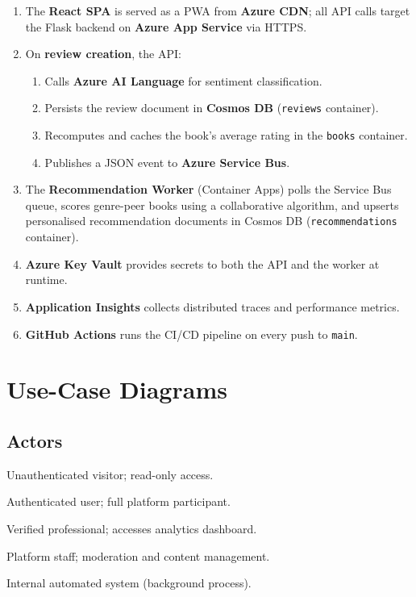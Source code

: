 \documentclass[12pt, a4paper]{report}
\begin{document}
\begin{enumerate}[nosep]
  \item The \textbf{React SPA} is served as a PWA from \textbf{Azure CDN}; all API calls
    target the Flask backend on \textbf{Azure App Service} via HTTPS.
  \item On \textbf{review creation}, the API:
    \begin{enumerate}[nosep, label=\alph*.]
      \item Calls \textbf{Azure AI Language} for sentiment classification.
      \item Persists the review document in \textbf{Cosmos DB} (\texttt{reviews} container).
      \item Recomputes and caches the book's average rating in the \texttt{books} container.
      \item Publishes a JSON event to \textbf{Azure Service Bus}.
    \end{enumerate}
  \item The \textbf{Recommendation Worker} (Container Apps) polls the Service Bus queue,
    scores genre-peer books using a collaborative algorithm, and upserts personalised
    recommendation documents in Cosmos DB (\texttt{recommendations} container).
  \item \textbf{Azure Key Vault} provides secrets to both the API and the worker at runtime.
  \item \textbf{Application Insights} collects distributed traces and performance metrics.
  \item \textbf{GitHub Actions} runs the CI/CD pipeline on every push to \texttt{main}.
\end{enumerate}

\chapter{Use-Case Diagrams}

\section{Actors}

\begin{description}[nosep]
  \item[Guest] Unauthenticated visitor; read-only access.
  \item[Reader] Authenticated user; full platform participant.
  \item[Author/Publisher] Verified professional; accesses analytics dashboard.
  \item[Administrator] Platform staff; moderation and content management.
  \item[Recommendation Worker] Internal automated system (background process).
\end{description}
\end{document}
